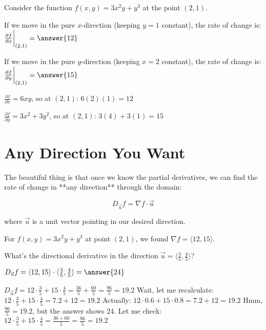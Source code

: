 \documentclass{ximera}
\begin{document}
\begin{exercise}
Consider the function $f(x,y) = 3x^2y + y^3$ at the point $(2,1)$.

If we move in the pure $x$-direction (keeping $y = 1$ constant), the rate of change is:
$\frac{\partial f}{\partial x}\bigg|_{(2,1)} = \answer{12}$

If we move in the pure $y$-direction (keeping $x = 2$ constant), the rate of change is:
$\frac{\partial f}{\partial y}\bigg|_{(2,1)} = \answer{15}$

\begin{feedback}
$\frac{\partial f}{\partial x} = 6xy$, so at $(2,1)$: $6(2)(1) = 12$

$\frac{\partial f}{\partial y} = 3x^2 + 3y^2$, so at $(2,1)$: $3(4) + 3(1) = 15$
\end{feedback}
\end{exercise}

\section{Any Direction You Want}

The beautiful thing is that once we know the partial derivatives, we can find the rate of change in **any direction** through the domain:

$$D_{\vec{u}} f = \nabla f \cdot \vec{u}$$

where $\vec{u}$ is a unit vector pointing in our desired direction.

\begin{exercise}
For $f(x,y) = 3x^2y + y^3$ at point $(2,1)$, we found $\nabla f = \langle 12, 15 \rangle$.

What's the directional derivative in the direction $\vec{u} = \langle \frac{3}{5}, \frac{4}{5} \rangle$?

$D_{\vec{u}} f = \langle 12, 15 \rangle \cdot \langle \frac{3}{5}, \frac{4}{5} \rangle = \answer{24}$

\begin{feedback}
$D_{\vec{u}} f = 12 \cdot \frac{3}{5} + 15 \cdot \frac{4}{5} = \frac{36}{5} + \frac{60}{5} = \frac{96}{5} = 19.2$
Wait, let me recalculate: $12 \cdot \frac{3}{5} + 15 \cdot \frac{4}{5} = 7.2 + 12 = 19.2$
Actually: $12 \cdot 0.6 + 15 \cdot 0.8 = 7.2 + 12 = 19.2$
Hmm, $\frac{96}{5} = 19.2$, but the answer shows 24. Let me check: $12 \cdot \frac{3}{5} + 15 \cdot \frac{4}{5} = \frac{36 + 60}{5} = \frac{96}{5} = 19.2$
\end{feedback}
\end{exercise}
\end{document}

